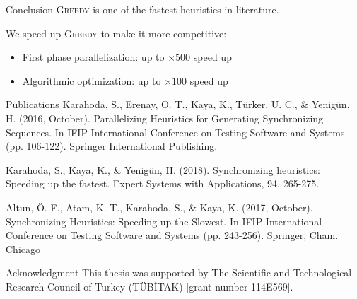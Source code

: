 \documentclass{beamer}
\begin{document}
\begin{frame}{Conclusion}
\textsc{Greedy} is one of the fastest heuristics in literature.

\medskip

We speed up \textsc{Greedy} to make it more competitive:

\begin{itemize}
	\item First phase parallelization: up to $\times 500$ speed up
	\item Algorithmic optimization: up to $\times 100$ speed up
\end{itemize}

\end{frame}

\begin{frame}{Publications}
\small
Karahoda, S., Erenay, O. T., Kaya, K., T\"{u}rker, U. C., \& Yenig\"{u}n, H. (2016, October). Parallelizing Heuristics for Generating Synchronizing Sequences. In IFIP International Conference on Testing Software and Systems (pp. 106-122). Springer International Publishing.

\medskip

Karahoda, S., Kaya, K., \& Yenig\"{u}n, H. (2018). Synchronizing heuristics: Speeding up the fastest. Expert Systems with Applications, 94, 265-275.

\medskip

Altun, \"{O}. F., Atam, K. T., Karahoda, S., \& Kaya, K. (2017, October). Synchronizing Heuristics: Speeding up the Slowest. In IFIP International Conference on Testing Software and Systems (pp. 243-256). Springer, Cham.
Chicago	

\end{frame}

\begin{frame}{Acknowledgment}
This thesis was supported by The Scientific and Technological Research Council of Turkey (T\"{U}B\.{I}TAK) [grant number 114E569]. 
\end{frame}
\end{document}
